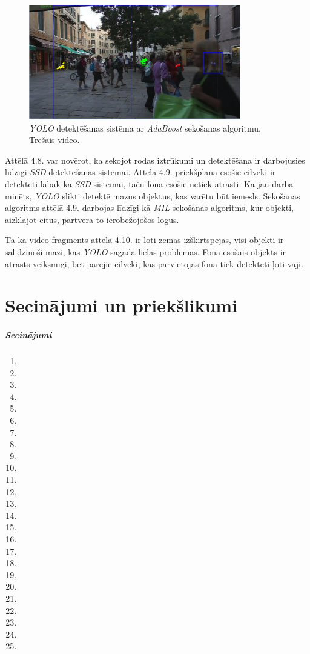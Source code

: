 \begin{figure}[H]%
	\centering
	\includegraphics[height=5cm]{images/yolo3.png} %
	\caption{\textit{YOLO} detektēšanas sistēma ar \textit{AdaBoost} sekošanas algoritmu. Trešais video.}%
	\label{fig:example}%
\end{figure}
\newpage
Attēlā 4.8. var novērot, ka sekojot rodas iztrūkumi un detektēšana ir darbojusies līdzīgi \textit{SSD} detektēšanas sistēmai. Attēlā 4.9. priekšplānā esošie cilvēki ir detektēti labāk kā \textit{SSD} sistēmai, taču fonā esošie netiek atrasti. Kā jau darbā minēts, \textit{YOLO} slikti detektē mazus objektus, kas varētu būt iemesls. Sekošanas algoritms attēlā 4.9. darbojas līdzīgi kā \textit{MIL} sekošanas algoritms, kur objekti, aizklājot citus, pārtvēra to ierobežojošos logus. 

Tā kā video fragments attēlā 4.10. ir ļoti zemas izšķirtspējas, visi objekti ir salīdzinoši mazi, kas \textit{YOLO} sagādā lielas problēmas. Fona esošais objekts ir atrasts veiksmīgi, bet pārējie cilvēki, kas pārvietojas fonā tiek detektēti ļoti vāji.
\chapter{Secinājumi un priekšlikumi}
\paragraph{Secinājumi}
\hfill\par
\begin{enumerate}
	\item 
	\item 
	\item 
	\item 
	\item 
	\item 
	\item 
	\item 
	\item 
	\item 
	\item 
	\item 
	\item 
	\item 
	\item 
	\item 
	\item 
	\item 
	\item 
	\item 
	\item 
	\item 
	\item 
	\item 
	\item 
\end{enumerate}
